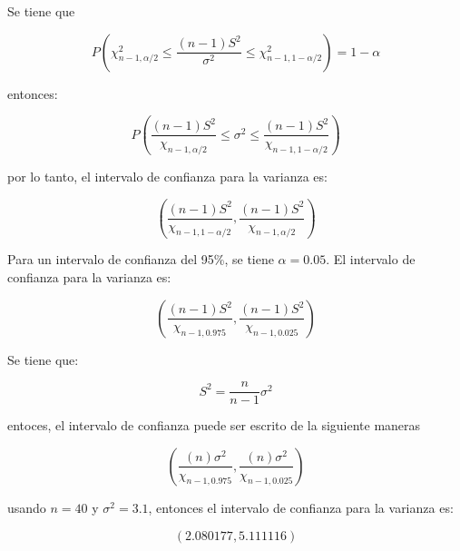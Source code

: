 \begin{enumerate}
          Se tiene que

          \begin{equation*}
              P(\chi_{n-1,\alpha/2}^2\leq \frac{(n-1)S^2}{\sigma^2}\leq \chi_{n-1,1-\alpha/2}^2) = 1-\alpha
          \end{equation*}


          entonces:

          \begin{equation*}
              P\left (\frac{(n-1)S^2}{\chi_{n-1,\alpha/2}} \leq \sigma^2 \leq \frac{(n-1)S^2}{\chi_{n-1,1-\alpha/2}} \right )
          \end{equation*}

          por lo tanto, el intervalo de confianza para la varianza es:

          \begin{equation*}
              \left (\frac{(n-1)S^2}{\chi_{n-1,1-\alpha/2}},\frac{(n-1)S^2}{\chi_{n-1,\alpha/2}}\right )
          \end{equation*}

          Para un intervalo de confianza del 95\%, se tiene $\alpha = 0.05$. El intervalo de confianza para la varianza es:

          \begin{equation*}
              \left (\frac{(n-1)S^2}{\chi_{n-1,0.975}},\frac{(n-1)S^2}{\chi_{n-1,0.025}}\right )
          \end{equation*}


          Se tiene que:

          \begin{equation*}
              S^2 = \frac{n}{n-1}\sigma^2
          \end{equation*}

          entoces, el intervalo de confianza puede ser escrito de la siguiente maneras

          \begin{equation*}
              \left (\frac{(n)\sigma^2 }{\chi_{n-1,0.975}},\frac{(n)\sigma^2}{\chi_{n-1,0.025}}\right )
          \end{equation*}

          usando $n=40$ y $\sigma^2=3.1$, entonces el intervalo de confianza para la varianza es:

          \begin{equation*}
              (2.080177,5.111116)
          \end{equation*}
\end{enumerate}